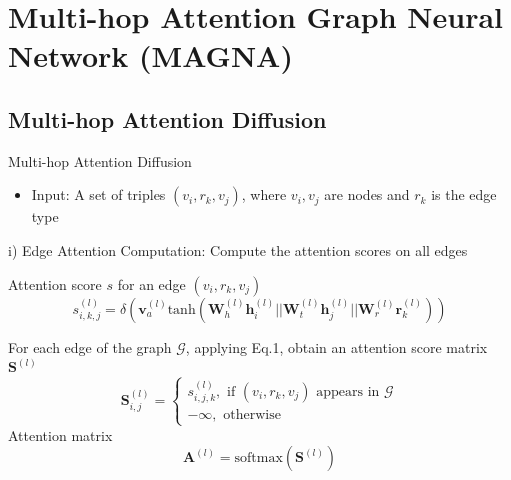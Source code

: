 \documentclass[notheorems, aspectratio=149]{beamer}
\begin{document}
		\section{Multi-hop Attention Graph Neural Network (MAGNA)}
		\subsection{Multi-hop Attention Diffusion}
		\begin{frame}{Multi-hop Attention Diffusion}
			\begin{itemize}
				\item Input: A set of triples $(v_i, r_k, v_j)$, where $v_i, v_j$ are nodes and $r_k$ is the edge type
			\end{itemize}
			i) Edge Attention Computation: Compute the attention scores on all edges
			
			Attention score $s$ for an edge $(v_i, r_k, v_j)$
			\begin{equation}
				s_{i, k, j}^{(l)} = \delta(\mathbf{v}_a^{(l)}\text{tanh}(\mathbf{W}_h^{(l)}\mathbf{h}_i^{(l)} || \mathbf{W}_t^{(l)}\mathbf{h}_j^{(l)} || \mathbf{W}_r^{(l)}\mathbf{r}_k^{(l)}))
			\end{equation}
		
			For each edge of the graph $\mathcal{G}$, applying Eq.1, obtain an attention score matrix $\mathbf{S}^{(l)}$
			\begin{equation}
				\mathbf{S}_{i, j}^{(l)} = \begin{cases}
					s_{i, j, k}^{(l)}, \text{ if } (v_i, r_k, v_j) \text{ appears in } \mathcal{G} \\
					- \infty, \text{ otherwise }
				\end{cases}
			\end{equation}
			Attention matrix
			\begin{equation}
				\mathbf{A}^{(l)} = \text{softmax}(\mathbf{S}^{(l)})
			\end{equation}
		\end{frame}
\end{document}
